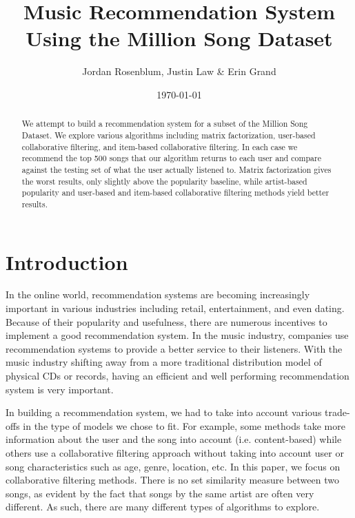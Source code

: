 \documentclass[11pt,preprint]{aastex}
\begin{document}
\title{Music Recommendation System Using the Million Song Dataset}

 \author{Jordan Rosenblum, Justin Law \& Erin Grand}
 
\date{\today}             

\begin{abstract}
We attempt to build a recommendation system for a subset of the Million Song Dataset. We explore various algorithms including matrix factorization, user-based collaborative filtering, and item-based collaborative filtering. In each case we recommend the top 500 songs that our algorithm returns to each user and compare against the testing set of what the user actually listened to. Matrix factorization gives the worst results, only slightly above the popularity baseline, while artist-based popularity and user-based and item-based collaborative filtering methods yield better results.
\end{abstract}

\tableofcontents

\section{Introduction}
In the online world, recommendation systems are becoming increasingly important in various industries including retail, entertainment, and even dating. 
Because of their popularity and usefulness, there are numerous incentives to implement a good recommendation system. 
In the music industry, companies use recommendation systems to provide a better service to their listeners. 
With the music industry shifting away from a more traditional distribution model of physical CDs or records, 
having an efficient and well performing recommendation system is very important. 

In building a recommendation system, we had to take into account various trade-offs in the type of models we chose to fit. For example, some methods take more information about the user and the song into account (i.e. content-based) while others use a collaborative filtering approach without taking into account user or song characteristics such as age, genre, location, etc. In this paper, we focus on collaborative filtering methods.
There is no set similarity measure between two songs, as evident by the fact that songs by the same artist are often very different. As such, there are many different types of algorithms to explore. 
\end{document}
